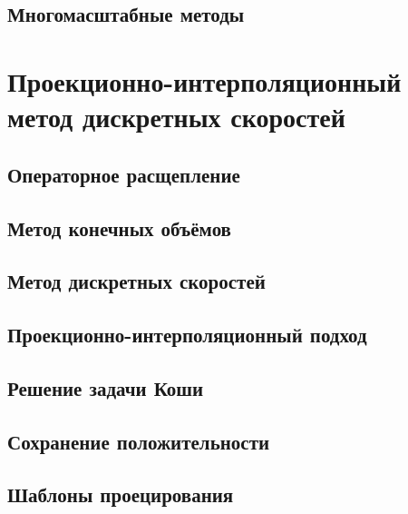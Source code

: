 
\subsection{Многомасштабные методы}



\section{Проекционно-интерполяционный метод дискретных скоростей} \label{sect:method}

\subsection{Операторное расщепление}
\subsection{Метод конечных объёмов}
\subsection{Метод дискретных скоростей}
\subsection{Проекционно-интерполяционный подход}
\subsection{Решение задачи Коши}
\subsection{Сохранение положительности}
\subsection{Шаблоны проецирования}


\clearpage
